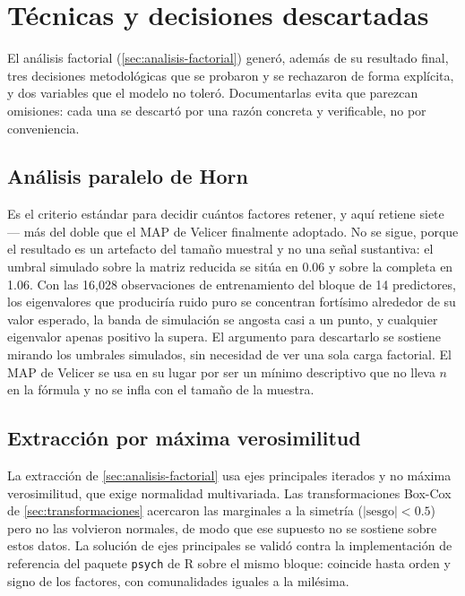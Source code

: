 \section{Técnicas y decisiones descartadas}\label{sec:tecnicas-descartadas}

El análisis factorial (\cref{sec:analisis-factorial}) generó, además de su resultado final,
tres decisiones metodológicas que se probaron y se rechazaron de forma
explícita, y dos variables que el modelo no toleró. Documentarlas evita que
parezcan omisiones: cada una se descartó por una razón concreta y verificable,
no por conveniencia.

\subsection{Análisis paralelo de Horn}

Es el criterio estándar para decidir cuántos factores retener, y aquí retiene
siete --- más del doble que el MAP de Velicer finalmente adoptado. No se sigue, porque el resultado es un artefacto del
tamaño muestral y no una señal sustantiva: el umbral simulado sobre la matriz
reducida se sitúa en 0.06 y sobre la completa en 1.06. Con las 16,028
observaciones de entrenamiento del bloque de 14 predictores, los eigenvalores que produciría ruido puro se concentran
fortísimo alrededor de su valor esperado, la banda de simulación se angosta
casi a un punto, y cualquier eigenvalor apenas positivo la supera. El
argumento para descartarlo se sostiene mirando los umbrales simulados, sin
necesidad de ver una sola carga factorial. El MAP de Velicer se usa en su
lugar por ser un mínimo descriptivo que no lleva $n$ en la fórmula y no se
infla con el tamaño de la muestra.

\subsection{Extracción por máxima verosimilitud}

La extracción de \cref{sec:analisis-factorial} usa ejes principales iterados y no máxima
verosimilitud, que exige normalidad multivariada. Las transformaciones
Box-Cox de \cref{sec:transformaciones} acercaron las marginales a la simetría
($|\text{sesgo}|<0.5$) pero no las volvieron normales, de modo que ese
supuesto no se sostiene sobre estos datos. La solución de ejes principales se
validó contra la implementación de referencia del paquete \texttt{psych} de R sobre el
mismo bloque: coincide hasta orden y signo de los factores, con comunalidades
iguales a la milésima.

